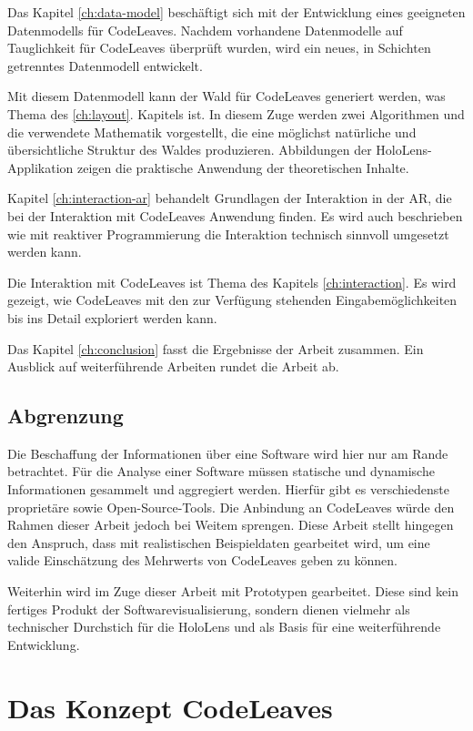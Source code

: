 Das Kapitel \ref{ch:data-model} beschäftigt sich mit der Entwicklung eines geeigneten Datenmodells für CodeLeaves. Nachdem vorhandene Datenmodelle auf Tauglichkeit für CodeLeaves überprüft wurden, wird ein neues, in Schichten getrenntes Datenmodell entwickelt.

Mit diesem Datenmodell kann der Wald für CodeLeaves generiert werden, was Thema des \ref{ch:layout}. Kapitels ist. In diesem Zuge werden zwei Algorithmen und die verwendete Mathematik vorgestellt, die eine möglichst natürliche und übersichtliche Struktur des Waldes produzieren. Abbildungen der HoloLens-Applikation zeigen die praktische Anwendung der theoretischen Inhalte.

Kapitel \ref{ch:interaction-ar} behandelt Grundlagen der Interaktion in der AR, die bei der Interaktion mit CodeLeaves Anwendung finden. Es wird auch beschrieben wie mit reaktiver Programmierung die Interaktion technisch sinnvoll umgesetzt werden kann.

Die Interaktion mit CodeLeaves ist Thema des Kapitels \ref{ch:interaction}. Es wird gezeigt, wie CodeLeaves mit den zur Verfügung stehenden Eingabemöglichkeiten bis ins Detail exploriert werden kann.

Das Kapitel \ref{ch:conclusion} fasst die Ergebnisse der Arbeit zusammen. Ein Ausblick auf weiterführende Arbeiten rundet die Arbeit ab.

\section{Abgrenzung}
\label{sec:distinction}

Die Beschaffung der Informationen über eine Software wird hier nur am Rande betrachtet. Für die Analyse einer Software müssen statische und dynamische Informationen gesammelt und aggregiert werden. Hierfür gibt es verschiedenste proprietäre sowie Open-Source-Tools. Die Anbindung an CodeLeaves würde den Rahmen dieser Arbeit jedoch bei Weitem sprengen. Diese Arbeit stellt hingegen den Anspruch, dass mit realistischen Beispieldaten gearbeitet wird, um eine valide Einschätzung des Mehrwerts von CodeLeaves geben zu können.

Weiterhin wird im Zuge dieser Arbeit mit Prototypen gearbeitet. Diese sind kein fertiges Produkt der Softwarevisualisierung, sondern dienen vielmehr als technischer Durchstich für die HoloLens und als Basis für eine weiterführende Entwicklung.

\chapter{Das Konzept CodeLeaves}
\label{ch:concept}

